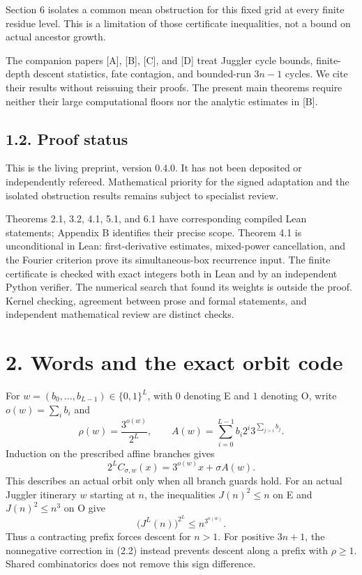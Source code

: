 \documentclass[11pt,a4paper]{article}
\begin{document}
Section 6 isolates a common mean obstruction for this fixed grid at
every finite residue level. This is a limitation of those certificate
inequalities, not a bound on actual ancestor growth.

The companion papers {[}A{]}, {[}B{]}, {[}C{]}, and {[}D{]} treat
Juggler cycle bounds, finite-depth descent statistics, fate contagion,
and bounded-run \(3n-1\) cycles. We cite their results without reissuing
their proofs. The present main theorems require neither their large
computational floors nor the analytic estimates in {[}B{]}.

\subsection{1.2. Proof status}\label{proof-status}

This is the living preprint, version 0.4.0. It has not been deposited or
independently refereed. Mathematical priority for the signed adaptation
and the isolated obstruction results remains subject to specialist
review.

Theorems 2.1, 3.2, 4.1, 5.1, and 6.1 have corresponding compiled Lean
statements; Appendix B identifies their precise scope. Theorem 4.1 is
unconditional in Lean: first-derivative estimates, mixed-power
cancellation, and the Fourier criterion prove its simultaneous-box
recurrence input. The finite certificate is checked with exact integers
both in Lean and by an independent Python verifier. The numerical search
that found its weights is outside the proof. Kernel checking, agreement
between prose and formal statements, and independent mathematical review
are distinct checks.

\section{2. Words and the exact orbit
code}\label{words-and-the-exact-orbit-code}

For \(w=(b_0,\ldots,b_{L-1})\in\{0,1\}^L\), with \(0\) denoting E and
\(1\) denoting O, write \(o(w)=\sum_i b_i\) and \[
\rho(w)=\frac{3^{o(w)}}{2^L},\qquad
A(w)=\sum_{i=0}^{L-1}b_i2^i3^{\sum_{j>i}b_j}.
\tag{2.1}
\] Induction on the prescribed affine branches gives \[
2^L C_{\sigma,w}(x)=3^{o(w)}x+\sigma A(w).
\tag{2.2}
\] This describes an actual orbit only when all branch guards hold. For
an actual Juggler itinerary \(w\) starting at \(n\), the inequalities
\(J(n)^2\le n\) on E and \(J(n)^2\le n^3\) on O give \[
\bigl(J^L(n)\bigr)^{2^L}\le n^{3^{o(w)}}.
\tag{2.3}
\] Thus a contracting prefix forces descent for \(n>1\). For positive
\(3n+1\), the nonnegative correction in (2.2) instead prevents descent
along a prefix with \(\rho\ge1\). Shared combinatorics does not remove
this sign difference.
\end{document}
